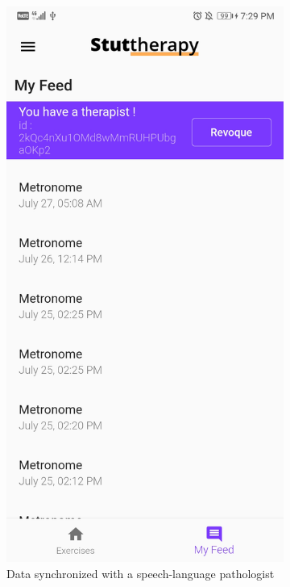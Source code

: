 \begin{appendices}
\begin{landscape}
\begin{figure}[h]
  \begin{subfigure}{.25\textwidth}
    \centering
    \includegraphics[width=.75\linewidth]{content/imgs/screen13.jpg}
    \caption{Data synchronized with a speech-language pathologist}
  \end{subfigure}%
  \begin{subfigure}{.25\textwidth}
    \centering

\end{subfigure}
\end{figure}
\end{landscape}
\end{appendices}
